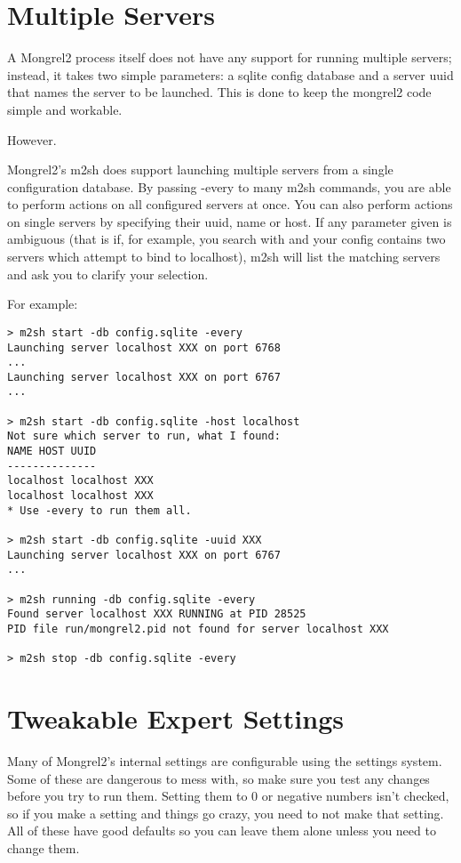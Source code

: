 \section{Multiple Servers}

A Mongrel2 process itself does not have any support for running multiple servers;
instead, it takes two simple parameters: a sqlite config database and a server uuid
that names the server to be launched. This is done to keep the mongrel2 code simple
and workable.

However.

Mongrel2's m2sh does support launching multiple servers from a single configuration
database. By passing -every to many m2sh commands, you are able to perform actions
on all configured servers at once. You can also perform actions on single servers
by specifying their uuid, name or host. If any parameter given is ambiguous (that
is if, for example, you search with  and your config contains
two servers which attempt to bind to localhost), m2sh will list the matching servers
and ask you to clarify your selection.

For example:
\begin{lstlisting}
> m2sh start -db config.sqlite -every
Launching server localhost XXX on port 6768
...
Launching server localhost XXX on port 6767
...

> m2sh start -db config.sqlite -host localhost
Not sure which server to run, what I found:
NAME HOST UUID
--------------
localhost localhost XXX
localhost localhost XXX
* Use -every to run them all.

> m2sh start -db config.sqlite -uuid XXX
Launching server localhost XXX on port 6767
...

> m2sh running -db config.sqlite -every
Found server localhost XXX RUNNING at PID 28525
PID file run/mongrel2.pid not found for server localhost XXX

> m2sh stop -db config.sqlite -every
\end{lstlisting}

\section{Tweakable Expert Settings}

Many of Mongrel2's internal settings are configurable using the settings system.
Some of these are dangerous to mess with, so make sure you test any changes before
you try to run them.  Setting them to 0 or negative numbers isn't checked, so if
you make a setting and things go crazy, you need to not make that setting.  All
of these have good defaults so you can leave them alone unless you need to change
them.

